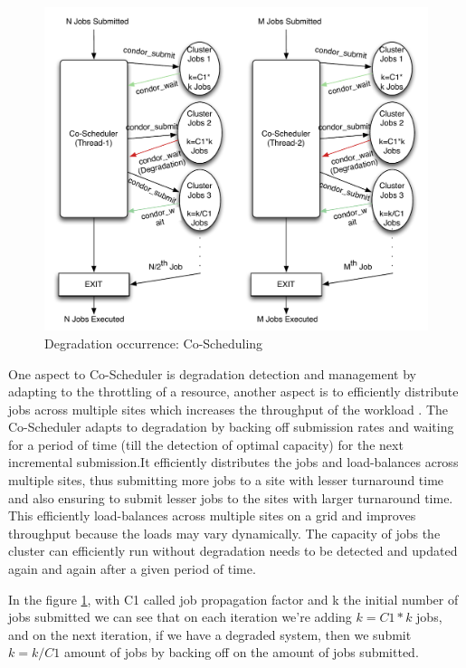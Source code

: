 \documentclass[ms,electronic,double]{nuthesis}
\begin{document}
\begin{figure}[htbp!]
\begin{center}
\includegraphics[scale=0.75]{images/degradation_detection}
\caption{Degradation occurrence: Co-Scheduling}
\label{fig:degradationdetect-intro}
\end{center}
\end{figure}

One aspect to Co-Scheduler is degradation detection and management by adapting 
to the throttling of a resource, another aspect is to efficiently distribute jobs 
across multiple sites which increases the throughput of the workload
. The Co-Scheduler adapts to degradation by backing off submission rates and waiting for a 
period of time (till the detection of optimal capacity) for the next incremental submission.It efficiently 
distributes the jobs and load-balances across multiple sites, thus submitting more 
jobs to a site with lesser turnaround time and also ensuring to submit lesser 
jobs to the sites with larger turnaround time. This efficiently load-balances 
across multiple sites on a grid and improves throughput because the loads may vary dynamically. 
The capacity of jobs the cluster can efficiently run without degradation needs to be detected and updated again and 
again after a given period of time.

In the figure \ref{fig:degradationdetect-intro}, with C1 called job propagation factor and k the initial number of 
jobs submitted we can see that on each iteration we're adding $k = C1 * k$ jobs, and on the
next iteration, if we have a degraded system, then we submit $k=k/C1$ amount of 
jobs by backing off on the amount of jobs submitted.
\end{document}
